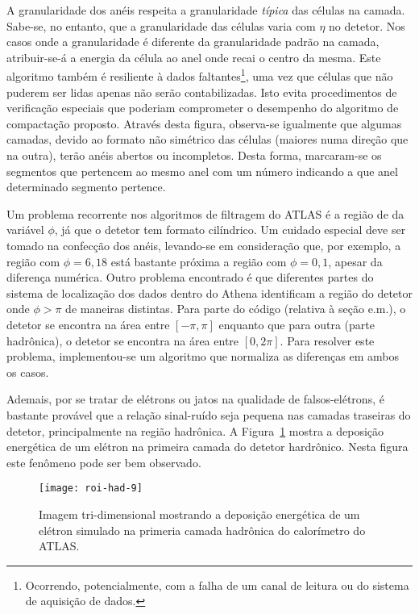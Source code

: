 A granularidade dos anéis respeita a granularidade \emph{típica} das células
na camada. Sabe-se, no entanto, que a granularidade das células varia com
$\eta$ no detetor. Nos casos onde a granularidade é diferente da granularidade
padrão na camada, atribuir-se-á a energia da célula ao anel onde recai o
centro da mesma. Este algoritmo também é resiliente à dados
faltantes\footnote{Ocorrendo, potencialmente, com a falha de um canal de
leitura ou do sistema de aquisição de dados.}, uma vez que células que não
puderem ser lidas apenas não serão contabilizadas. Isto evita procedimentos de
verificação especiais que poderiam comprometer o desempenho do algoritmo de
compactação proposto. Através desta figura, observa-se igualmente que algumas
camadas, devido ao formato não simétrico das células (maiores numa direção que
na outra), terão anéis abertos ou incompletos. Desta forma, marcaram-se os
segmentos que pertencem ao mesmo anel com um número indicando a que anel
determinado segmento pertence.

Um problema recorrente nos algoritmos de filtragem do ATLAS é a região de
 da variável $\phi$, já que o detetor tem formato
cilíndrico. Um cuidado especial deve ser tomado na confecção dos anéis,
levando-se em consideração que, por exemplo, a região com $\phi = 6,18$ está
bastante próxima a região com $\phi = 0,1$, apesar da diferença
numérica. Outro problema encontrado é que diferentes partes do sistema de
localização dos dados dentro do Athena identificam a região do detetor onde
$\phi > \pi$ de maneiras distintas. Para parte do código (relativa à seção
e.m.), o detetor se encontra na área entre $[-\pi, \pi]$ enquanto que para
outra (parte hadrônica), o detetor se encontra na área entre $[0, 2\pi]$. Para
resolver este problema, implementou-se um algoritmo que normaliza as
diferenças em ambos os casos.

Ademais, por se tratar de elétrons ou jatos na qualidade de falsos-elétrons, é
bastante provável que a relação sinal-ruído seja pequena nas camadas traseiras
do detetor, principalmente na região hadrônica. A Figura~\ref{fig:roi-had-9}
mostra a deposição energética de um elétron na primeira camada do detetor
hardrônico. Nesta figura este fenômeno pode ser bem observado.

\begin{figure}
\begin{center}
\texttt{[image: roi-had-9]}
\end{center}
\caption{Imagem tri-dimensional mostrando a deposição energética de
um elétron simulado na primeria camada hadrônica do calorímetro do ATLAS.}
\label{fig:roi-had-9}
\end{figure}


